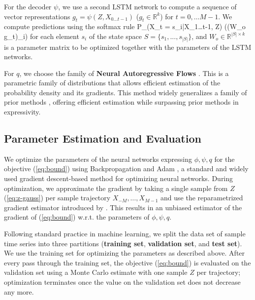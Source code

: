 \documentclass[entropy,article,submit,moreauthors,pdftex,10pt,a4paper]{Definitions/mdpi}
\newcommand{\key}{\textbf}
\let\oldequation\equation
\let\oldendequation\endequation
\renewenvironment{equation}
  {\linenomathNonumbers\oldequation}
  {\oldendequation\endlinenomath}
\begin{document}
For the decoder $\psi$, we use a second LSTM network to compute a sequence of vector representations $g_t = \psi(Z, X_{0\dots t-1})$ ($g_t \in \mathbb{R}^k$) for $t = 0, \dots M-1$.
We compute predictions using the softmax rule 
\begin{equation}
	P_\psi(X_t = s_i|X_{1\dots t-1}, Z) \propto \exp((W_o g_t)_i)
\end{equation}
for each element $s_i$ of the state space $S = \{s_1, ..., s_{|S|}\}$, and $W_o \in \mathbb{R}^{|S| \times k}$ is a parameter matrix to be optimized together with the parameters of the LSTM networks.


For $q$, we choose the family of \key{Neural Autoregressive Flows} \citep{huang-neural-2018}. 
This is a parametric family of distributions that allows efficient estimation of the probability density and its gradients.
This method widely generalizes a family of prior methods \citep{rezende-variational-2015, kingma-improving-2016, papamakarios-masked-2017}, offering efficient estimation while surpassing prior methods in expressivity.


\subsection{Parameter Estimation and Evaluation}\label{sec:parameter-estimation}
We optimize the parameters of the neural networks expressing $\phi, \psi, q$ for the objective (\ref{eq:bound}) using Backpropagation and Adam \citep{kingma-adam:-2014}, a standard and widely used gradient descent-based method for optimizing neural networks.
During optimization, we approximate the gradient by taking a single sample from $Z$ (\ref{eq:z-gauss}) per sample trajectory $X_{-M}, \dots, X_{M-1}$ and use the reparametrized gradient estimator introduced by \citet{kingma-auto-encoding-2014}.
This results in an unbiased estimator of the gradient of (\ref{eq:bound}) w.r.t. the parameters of $\phi, \psi, q$.

Following standard practice in machine learning, we split the data set of sample time series into three partitions (\key{training set}, \key{validation set}, and \key{test set}). 
We use the training set for optimizing the parameters as described above.
After every pass through the training set, the objective (\ref{eq:bound}) is evaluated on the validation set using a Monte Carlo estimate with one sample $Z$ per trajectory; optimization terminates once the value on the validation set does not decrease any more.
\end{document}
